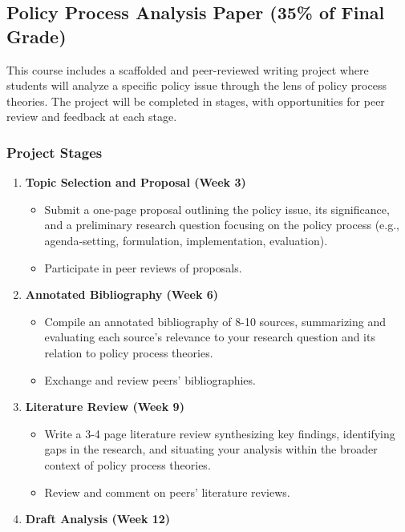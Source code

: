 \documentclass[12pt, letterpaper]{article}
\begin{document}
\subsection*{Policy Process Analysis Paper (35\% of Final Grade)}

This course includes a scaffolded and peer-reviewed writing project where students will analyze a specific policy issue through the lens of policy process theories. The project will be completed in stages, with opportunities for peer review and feedback at each stage.

\subsubsection*{Project Stages}
\begin{enumerate}
    \item \textbf{Topic Selection and Proposal (Week 3)}
    \begin{itemize}
        \item Submit a one-page proposal outlining the policy issue, its significance, and a preliminary research question focusing on the policy process (e.g., agenda-setting, formulation, implementation, evaluation).
        \item Participate in peer reviews of proposals.
    \end{itemize}
    \item \textbf{Annotated Bibliography (Week 6)}
    \begin{itemize}
        \item Compile an annotated bibliography of 8-10 sources, summarizing and evaluating each source's relevance to your research question and its relation to policy process theories.
        \item Exchange and review peers' bibliographies.
    \end{itemize}
    \item \textbf{Literature Review (Week 9)}
    \begin{itemize}
        \item Write a 3-4 page literature review synthesizing key findings, identifying gaps in the research, and situating your analysis within the broader context of policy process theories.
        \item Review and comment on peers' literature reviews.
    \end{itemize}
    \item \textbf{Draft Analysis (Week 12)}
    \begin{itemize}

\end{itemize}
\end{enumerate}
\end{document}
